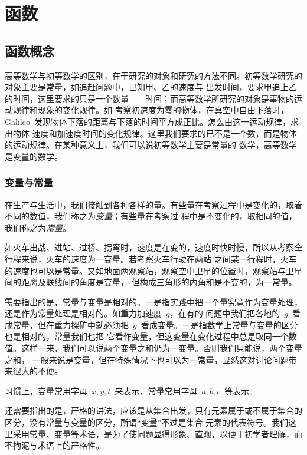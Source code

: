 

\chapter{函\emspace 数}\label{ch:1}

\section{函数概念}\label{sec:1.1}

高等数学与初等数学的区别，在于研究的对象和研究的方法不同。初等数学研究的对象主要是常量，如追赶问题中，已知甲、乙的速度与
出发时间，要求甲追上乙的时间，这里要求的只是一个数量——时间；而高等数学所研究的对象是事物的运动规律和现象的变化规律。如
考察初速度为零的物体，在真空中自由下落时，Galileo~发现物体下落的距离与下落的时间平方成正比。怎么由这一运动规律，求出物体
速度和加速度时间的变化规律。这里我们要求的已不是一个数，而是物体的运动规律。在某种意义上，我们可以说初等数学主要是常量的
数学，高等数学是变量的数学。

\subsection{变量与常量}

在生产与生活中，我们接触到各种各样的量。有些量在考察过程中是变化的，取着不同的数值，我们称之为\emph{变量}；有些量在考察过
程中是不变化的，取相同的值，我们称之为\emph{常量}。

如火车出战、进站、过桥、拐弯时，速度是在变的，速度时快时慢，所以从考察全行程来说，火车的速度为一变量。若考察火车行驶在两站
之间某一行程时，火车的速度也可以是常量。又如地面两观察站，观察空中卫星的位置时，观察站与卫星间的距离及联线间的角度是变量，%
但构成三角形的内角和是不变的，为一常量。

需要指出的是，常量与变量是相对的。一是指实践中把一个量究竟作为变量处理，还是作为常量处理是相对的。如重力加速度~$g$，在有的
问题中我们把各地的~$g$~看成常量，但在重力探矿中就必须把~$g$~看成变量。一是指数学上常量与变量的区分也是相对的，常量我们也把
它看作变量，但这变量在变化过程中总是取同一个数值。这样一来，我们可以说两个变量之和仍为一变量。否则我们只能说，两个变量之和，%
一般来说是变量，但在特殊情况下也可以为一常量，显然这对讨论问题带来很大的不便。

习惯上，变量常用字母~$x,y,t$~来表示，常量常用字母~$a,b,c$~等表示。

还需要指出的是，严格的讲法，应该是从集合出发，只有元素属于或不属于集合的区分，没有常量与变量的区分，所谓“变量”不过是集合
元素的代表符号。我们这里采用常量、变量等术语，是为了使问题显得形象、直观，以便于初学者理解，而不拘泥与术语上的严格性。

